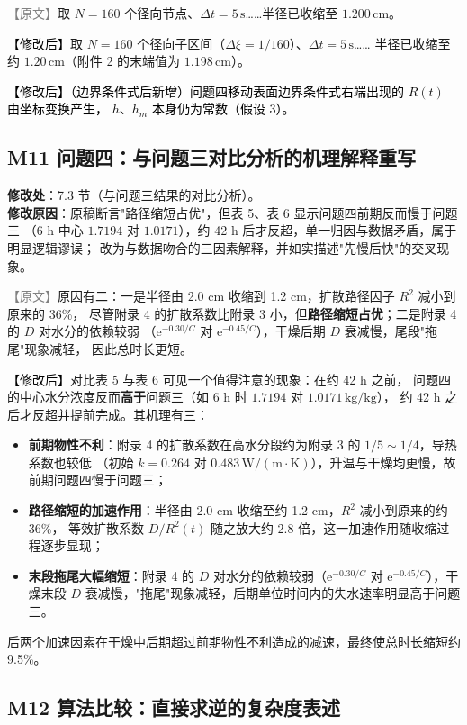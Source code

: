 \documentclass[UTF8,zihao=-4]{ctexart}
\newcommand{\yuanduan}[1]{\par\noindent\textcolor{gray}{\small 【原文】}#1\par}
\newcommand{\xinduan}[1]{\par\noindent\textcolor{black}{\small 【修改后】}#1\par}
\begin{document}
\yuanduan{取 $N=160$ 个径向节点、$\Delta t=5\,\mathrm{s}$……半径已收缩至 $1.200\,\mathrm{cm}$。}
\xinduan{取 $N=160$ 个径向子区间（$\Delta\xi=1/160$）、$\Delta t=5\,\mathrm{s}$……
半径已收缩至约 $1.20\,\mathrm{cm}$（附件 2 的末端值为 $1.198\,\mathrm{cm}$）。}

\noindent\textcolor{black}{\small 【修改后】（边界条件式后新增）问题四移动表面边界条件式右端出现的 $R(t)$ 由坐标变换产生，
$h$、$h_m$ 本身仍为常数（假设 3）。}

\subsection*{M11 问题四：与问题三对比分析的机理解释重写}

\textbf{修改处}：7.3 节（与问题三结果的对比分析）。\\
\textbf{修改原因}：原稿断言"路径缩短占优"，但表 5、表 6 显示问题四前期反而慢于问题三
（6 h 中心 $1.7194$ 对 $1.0171$），约 42 h 后才反超，单一归因与数据矛盾，属于明显逻辑谬误；
改为与数据吻合的三因素解释，并如实描述"先慢后快"的交叉现象。

\yuanduan{原因有二：一是半径由 2.0 cm 收缩到 1.2 cm，扩散路径因子 $R^2$ 减小到原来的 36\%，
尽管附录 4 的扩散系数比附录 3 小，但\textbf{路径缩短占优}；二是附录 4 的 $D$ 对水分的依赖较弱
（$\mathrm{e}^{-0.30/C}$ 对 $\mathrm{e}^{-0.45/C}$），干燥后期 $D$ 衰减慢，尾段"拖尾"现象减轻，
因此总时长更短。}
\xinduan{对比表 5 与表 6 可见一个值得注意的现象：在约 42 h 之前，
问题四的中心水分浓度反而\textbf{高于}问题三（如 6 h 时 $1.7194$ 对 $1.0171\,\mathrm{kg/kg}$），
约 42 h 之后才反超并提前完成。其机理有三：
\begin{itemize}
\item \textbf{前期物性不利}：附录 4 的扩散系数在高水分段约为附录 3 的 $1/5\sim1/4$，导热系数也较低
（初始 $k=0.264$ 对 $0.483\,\mathrm{W/(m\cdot K)}$），升温与干燥均更慢，故前期问题四慢于问题三；
\item \textbf{路径缩短的加速作用}：半径由 2.0 cm 收缩至约 1.2 cm，$R^2$ 减小到原来的约 36\%，
等效扩散系数 $D/R^2(t)$ 随之放大约 2.8 倍，这一加速作用随收缩过程逐步显现；
\item \textbf{末段拖尾大幅缩短}：附录 4 的 $D$ 对水分的依赖较弱（$\mathrm{e}^{-0.30/C}$ 对
$\mathrm{e}^{-0.45/C}$），干燥末段 $D$ 衰减慢，"拖尾"现象减轻，后期单位时间内的失水速率明显高于问题三。
\end{itemize}
后两个加速因素在干燥中后期超过前期物性不利造成的减速，最终使总时长缩短约 9.5\%。}

\subsection*{M12 算法比较：直接求逆的复杂度表述}
\end{document}
